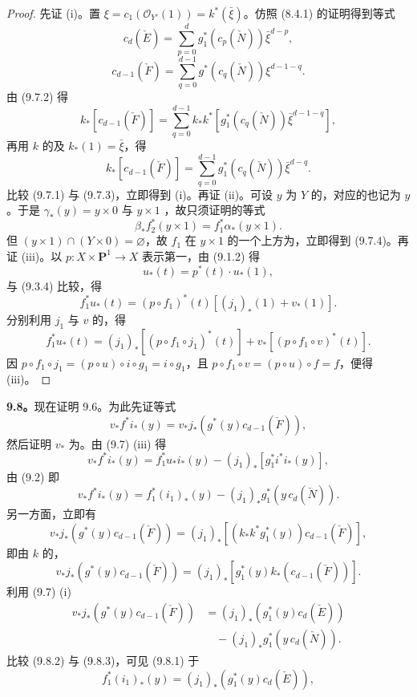 \begin{proof}
先证 (i)。置 $\xi=c_1(\mathscr O_{Y'}(1))=k^*(\bar\xi)$。仿照 (8.4.1) 的证明得到等式
\[
 c_d(\check E)=\sum_{p=0}^d g_1^*(c_p(\check N))\bar\xi^{d-p},\tag{9.7.1}
\]
\[
 c_{d-1}(\check F)=\sum_{q=0}^{d-1}g^*(c_q(\check N))\xi^{d-1-q}.\tag{9.7.2}
\]
由 (9.7.2) 得
\[
 k_*[c_{d-1}(\check F)]=\sum_{q=0}^{d-1}k_*k^*[g_1^*(c_q(\check N))\bar\xi^{d-1-q}],
\]
再用 $k$ 的及 $k_*(1)=\bar\xi$，得
\[
 k_*[c_{d-1}(\check F)]=\sum_{q=0}^{d-1}g_1^*(c_q(\check N))\bar\xi^{d-q}.\tag{9.7.3}
\]
比较 (9.7.1) 与 (9.7.3)，立即得到 (i)。再证 (ii)。可设 $y$ 为 $Y$ 的，对应的也记为 $y$。于是 $\gamma_*(y)=y\times0$ 与 $y\times1$ ，故只须证明的等式
\[
 \beta_*f_2^*(y\times1)=f_1^*\alpha_*(y\times1).\tag{9.7.4}
\]
但 $(y\times1)\cap(Y\times0)=\varnothing$，故 $f_1$ 在 $y\times1$ 的一个上方为，立即得到 (9.7.4)。再证 (iii)。以 $p:X\times\mathbf P^1\to X$ 表示第一，由 (9.1.2) 得
\[
 u_*(t)=p^*(t)\cdot u_*(1),\tag{9.7.5}
\]
与 (9.3.4) 比较，得
\[
 f_1^*u_*(t)=(p\circ f_1)^*(t)[(j_1)_*(1)+v_*(1)].\tag{9.7.6}
\]
分别利用 $j_1$ 与 $v$ 的，得
\[
 f_1^*u_*(t)=(j_1)_*[(p\circ f_1\circ j_1)^*(t)]+v_*[(p\circ f_1\circ v)^*(t)].
 \tag{9.7.7}
\]
因 $p\circ f_1\circ j_1=(p\circ u)\circ i\circ g_1=i\circ g_1$，且 $p\circ f_1\circ v=(p\circ u)\circ f=f$，便得 (iii)。
\end{proof}
\textbf{9.8。}现在证明 9.6。为此先证等式
\[
 v_*f^*i_*(y)=v_*j_*(g^*(y)c_{d-1}(\check F)),\tag{9.8.1}
\]
然后证明 $v_*$ 为。由 (9.7) (iii) 得
\[
 v_*f^*i_*(y)=f_1^*u_*i_*(y)-(j_1)_*[g_1^*i^*i_*(y)],
\]
由 (9.2) 即
\[
 v_*f^*i_*(y)=f_1^*(i_1)_*(y)-(j_1)_*g_1^*(y\,c_d(\check N)).\tag{9.8.2}
\]
另一方面，立即有
\[
 v_*j_*(g^*(y)c_{d-1}(\check F))=(j_1)_*[(k_*k^*g_1^*(y))c_{d-1}(\check F)],
\]
即由 $k$ 的，
\[
 v_*j_*(g^*(y)c_{d-1}(\check F))=(j_1)_*[g_1^*(y)k_*(c_{d-1}(\check F))].
\]
利用 (9.7) (i) 
\[
\begin{aligned}
 v_*j_*(g^*(y)c_{d-1}(\check F))
 &=(j_1)_*(g_1^*(y)c_d(\check E))\\
 &\quad-(j_1)_*g_1^*(y\,c_d(\check N)).
\end{aligned}\tag{9.8.3}
\]
比较 (9.8.2) 与 (9.8.3)，可见 (9.8.1) 于
\[
 f_1^*(i_1)_*(y)=(j_1)_*(g_1^*(y)c_d(\check E)),\tag{9.8.4}
\]
